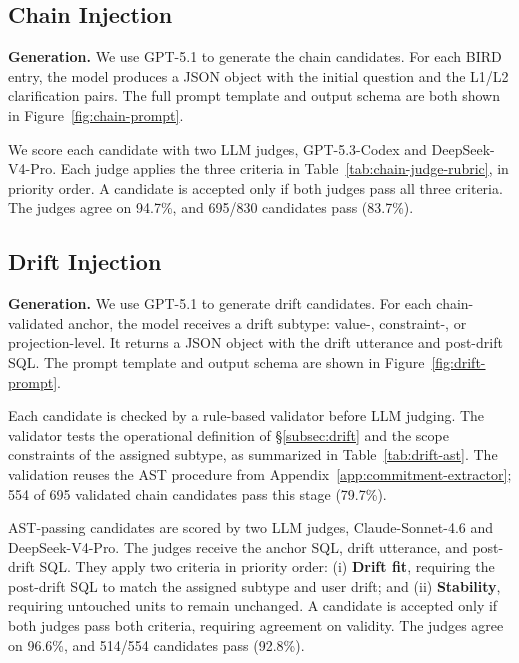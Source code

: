 \subsection{Chain Injection}
\label{app:pipeline-chain}
\noindent\textbf{Generation.}
We use GPT-5.1 to generate the chain candidates. For each BIRD entry, the model produces a JSON object with the initial question and the L1/L2 clarification pairs. The full prompt template and output schema are both shown in Figure~\ref{fig:chain-prompt}.

We score each candidate with two LLM judges, GPT-5.3-Codex and DeepSeek-V4-Pro. Each judge applies the three criteria in Table~\ref{tab:chain-judge-rubric}, in priority order. A candidate is accepted only if both judges pass all three criteria. The judges agree on 94.7\%, and 695/830 candidates pass (83.7\%).

\subsection{Drift Injection}
\label{app:pipeline-drift}

\noindent\textbf{Generation.}
We use GPT-5.1 to generate drift candidates. For each chain-validated anchor, the model receives a drift subtype: value-, constraint-, or projection-level. It returns a JSON object with the drift utterance and post-drift SQL. The prompt template and output schema are shown in Figure~\ref{fig:drift-prompt}.

Each candidate is checked by a rule-based validator before LLM judging. The validator tests the operational definition of \S\ref{subsec:drift} and the scope constraints of the assigned subtype, as summarized in Table~\ref{tab:drift-ast}. The validation reuses the AST procedure from Appendix~\ref{app:commitment-extractor}; 554 of 695 validated chain candidates pass this stage (79.7\%).

AST-passing candidates are scored by two LLM judges, Claude-Sonnet-4.6 and DeepSeek-V4-Pro. The judges receive the anchor SQL, drift utterance, and post-drift SQL. They apply two criteria in priority order: (i) \textbf{Drift fit}, requiring the post-drift SQL to match the assigned subtype and user drift; and (ii) \textbf{Stability}, requiring untouched units to remain unchanged. A candidate is accepted only if both judges pass both criteria, requiring agreement on validity. The judges agree on 96.6\%, and 514/554 candidates pass (92.8\%).

